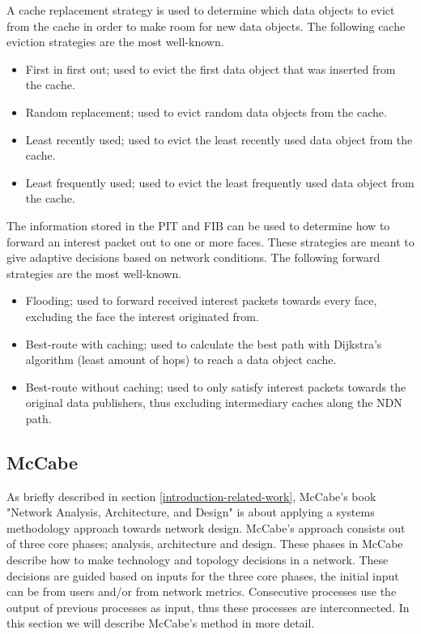 A cache replacement strategy is used to determine which data objects to evict from the cache in order to make room for new data objects. The following cache eviction strategies are the most well-known.
\begin{itemize}
    \item First in first out; used to evict the first data object that was inserted from the cache.
    \item Random replacement; used to evict random data objects from the cache.
    \item Least recently used; used to evict the least recently used data object from the cache.
    \item Least frequently used; used to evict the least frequently used data object from the cache.
\end{itemize}

The information stored in the PIT and FIB can be used to determine how to forward an interest packet out to one or more faces. These strategies are meant to give adaptive decisions based on network conditions. The following forward strategies are the most well-known.
\begin{itemize}
    \item Flooding; used to forward received interest packets towards every face, excluding the face the interest originated from.
    \item Best-route with caching; used to calculate the best path with Dijkstra's algorithm (least amount of hops) to reach a data object cache.
    \item Best-route without caching; used to only satisfy interest packets towards the original data publishers, thus excluding intermediary caches along the NDN path.
\end{itemize}

\subsection{McCabe}
\label{overview-mccabe}
As briefly described in section \ref{introduction-related-work}, McCabe's book "Network Analysis, Architecture, and Design" \cite{mccabe2010network} is about applying a systems methodology approach towards network design. McCabe's approach consists out of three core phases; analysis, architecture and design. These phases in McCabe describe how to make technology and topology decisions in a network. These decisions are guided based on inputs for the three core phases, the initial input can be from users and/or from network metrics. Consecutive processes use the output of previous processes as input, thus these processes are interconnected. In this section we will describe McCabe's method in more detail.

